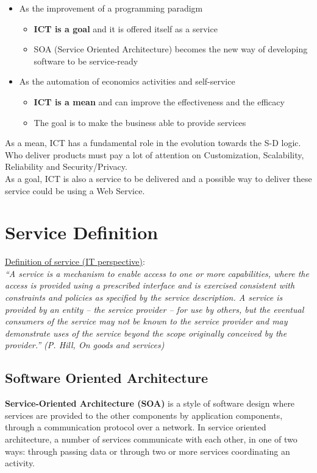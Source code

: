 \documentclass[10pt,a4paper]{article}
\begin{document}
\begin{itemize}
	\item As the improvement of a programming paradigm
	\begin{itemize}
		\item \textbf{ICT is a goal} and it is offered itself as a service
		\item SOA (Service Oriented Architecture) becomes the new way of developing software to be service-ready
		\end{itemize}
\item As the automation of economics activities and self-service
	\begin{itemize}
		\item \textbf{ICT is a mean} and can improve the effectiveness and the efficacy
		\item The goal is to make the business able to provide services
	\end{itemize}
\end{itemize}
As a mean, ICT has a fundamental role in the evolution towards the S-D logic. Who deliver products must pay a lot of attention on Customization, Scalability, Reliability and Security/Privacy. \\
As a goal, ICT is also a service to be delivered and a possible way to deliver these service could be using a Web Service.
\section{\LARGE Service Definition}
\uline{Definition of service (IT perspective)}: \\
\textit{“A service is a mechanism to enable access to one or more capabilities, where the access is provided using a prescribed interface and is exercised consistent with constraints and policies as specified by the service description. A service is provided by an entity – the service provider – for use by others, but the eventual consumers of the service may not be known to the service provider and may demonstrate uses of the service beyond the scope originally conceived by the provider.”  (P. Hill, On goods and services)} 
\subsection{Software Oriented Architecture}
\textbf{Service-Oriented Architecture (SOA)} is a style of software design where services are provided to the other components by application components, through a communication protocol over a network. In service oriented architecture, a number of services communicate with each other, in one of two ways: through passing data or through two or more services coordinating an activity.
\end{document}

